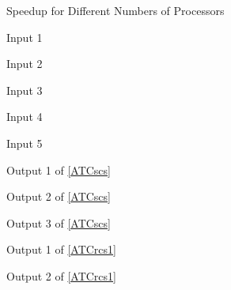 \documentclass[12pt,titlepage]{article}
\begin{document}
\begin{figure}
\centering
{}
\caption{Speedup for Different Numbers of Processors}
\label{speedup}
\end{figure}


\begin{figure}
\centering
{}
\caption{Input 1}
\label{input1}
\end{figure}

\begin{figure}
\centering
{}
\caption{Input 2}
\label{input2}
\end{figure}

\begin{figure}
\centering
{}
\caption{Input 3}
\label{input3}
\end{figure}

\begin{figure}
\centering
{}
\caption{Input 4}
\label{input4}
\end{figure}

\begin{figure}
\centering
{}
\caption{Input 5}
\label{input5}
\end{figure}

\begin{figure}
\centering
{}
\caption{Output 1 of \cref{ATCscs}}
\label{output11}
\end{figure}

\begin{figure}
\centering
{}
\caption{Output 2 of \cref{ATCscs}}
\label{output12}
\end{figure}

\begin{figure}
\centering
{}
\caption{Output 3 of \cref{ATCscs}}
\label{output13}
\end{figure}

\begin{figure}
\centering
{}
\caption{Output 1 of \cref{ATCrcs1}}
\label{output21}
\end{figure}

\begin{figure}
\centering
{}
\caption{Output 2 of \cref{ATCrcs1}}
\label{output22}
\end{figure}
\end{document}

